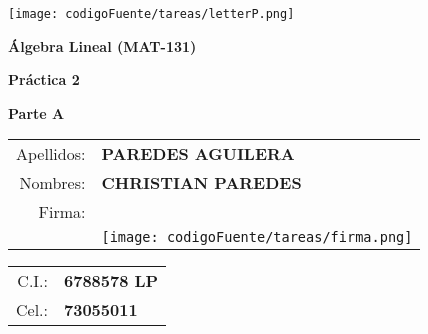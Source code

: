 \begin{flushright}
\texttt{[image: codigoFuente/tareas/letterP.png]}
\end{flushright}

\begin{center}
\textbf{\Large Álgebra Lineal (MAT-131)}

\vspace{.5cm}
\textbf{\large Práctica 2}

\vspace{.2cm}
\textbf{Parte A}
\end{center}

\vspace{.5cm}

\begin{multicols}{2}
    \begin{center}
	\begin{tabular}{rl}
	    Apellidos: & \textbf{PAREDES AGUILERA}\\
	    Nombres: & \textbf{CHRISTIAN PAREDES}\\
	    Firma: & \\
		   &\texttt{[image: codigoFuente/tareas/firma.png]}
	\end{tabular}
	\begin{tabular}{rl}
	    C.I.: & \textbf{6788578 LP}\\
	    Cel.: & \textbf{73055011}
	\end{tabular}
    \end{center}
\end{multicols}

\vspace{.5cm}

